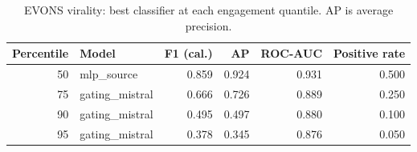 \begin{table}[ht]
\centering
\small
\caption{EVONS virality: best classifier at each engagement quantile. AP is average precision.}
\label{tab:evons-revised}
\begin{tabular}{rlrrrr}
\toprule
Percentile & Model & F1 (cal.) & AP & ROC-AUC & Positive rate \\
\midrule
50 & mlp\_source & 0.859 & 0.924 & 0.931 & 0.500 \\
75 & gating\_mistral & 0.666 & 0.726 & 0.889 & 0.250 \\
90 & gating\_mistral & 0.495 & 0.497 & 0.880 & 0.100 \\
95 & gating\_mistral & 0.378 & 0.345 & 0.876 & 0.050 \\
\bottomrule
\end{tabular}
\end{table}
